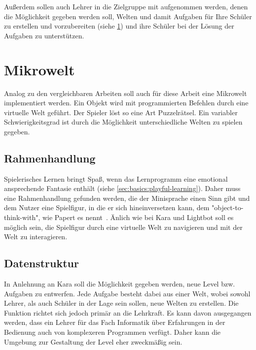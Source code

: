 Außerdem sollen auch Lehrer in die Zielgruppe mit aufgenommen werden, denen die Möglichkeit gegeben werden soll, Welten und damit Aufgaben für Ihre Schüler zu erstellen und vorzubereiten (siehe \ref{sec:requirements:world}) und ihre Schüler bei der Lösung der Aufgaben zu unterstützen.

\section{Mikrowelt}
\label{sec:requirements:world}

Analog zu den vergleichbaren Arbeiten soll auch für diese Arbeit eine Mikrowelt implementiert werden. Ein Objekt wird mit programmierten Befehlen durch eine virtuelle Welt geführt. Der Spieler löst so eine Art Puzzelrätsel. Ein variabler Schwierigkeitsgrad ist durch die Möglichkeit unterschiedliche Welten zu spielen gegeben.

\subsection{Rahmenhandlung}
\label{sec:requirements:world:story}

Spielerisches Lernen bringt Spaß, wenn das Lernprogramm eine emotional ansprechende Fantasie enthält (siehe \ref{sec:basics:playful-learning}). Daher muss eine Rahmenhandlung gefunden werden, die der Minisprache einen Sinn gibt und dem Nutzer eine Spielfigur, in die er sich hineinversetzen kann, dem "object-to-think-with", wie Papert es nennt~\cite[11]{papert1980}. Änlich wie bei Kara und Lightbot soll es möglich sein, die Spielfigur durch eine virtuelle Welt zu navigieren und mit der Welt zu interagieren.

\subsection{Datenstruktur}
\label{sec:requirements:world:structure}

In Anlehnung an Kara soll die Möglichkeit gegeben werden, neue Level bzw. Aufgaben zu entwerfen. Jede Aufgabe besteht dabei aus einer Welt, wobei sowohl Lehrer, als auch Schüler in der Lage sein sollen, neue Welten zu erstellen. Die Funktion richtet sich jedoch primär an die Lehrkraft. Es kann davon ausgegangen werden, dass ein Lehrer für das Fach Informatik über Erfahrungen in der Bedienung auch von komplexeren Programmen verfügt. Daher kann die Umgebung zur Gestaltung der Level eher zweckmäßig sein.


